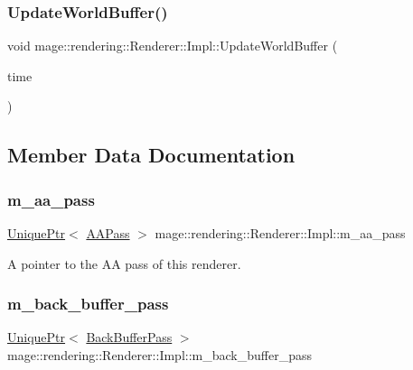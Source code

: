 \subsubsection{\texorpdfstring{Update\+World\+Buffer()}{UpdateWorldBuffer()}}
{\footnotesize\ttfamily void mage\+::rendering\+::\+Renderer\+::\+Impl\+::\+Update\+World\+Buffer (\begin{DoxyParamCaption}\item[{const \mbox{\hyperlink{classmage_1_1_game_time}{Game\+Time}} \&}]{time }\end{DoxyParamCaption})\hspace{0.3cm}{\ttfamily [private]}}



\subsection{Member Data Documentation}
\mbox{\label{classmage_1_1rendering_1_1_renderer_1_1_impl_aeb6351e4bacece7f3682685d74593d18}} 
\subsubsection{\texorpdfstring{m\+\_\+aa\+\_\+pass}{m\_aa\_pass}}
{\footnotesize\ttfamily \mbox{\hyperlink{namespacemage_a3316d7143a973e37adf1110f2e80ca31}{Unique\+Ptr}}$<$ \mbox{\hyperlink{classmage_1_1rendering_1_1_a_a_pass}{A\+A\+Pass}} $>$ mage\+::rendering\+::\+Renderer\+::\+Impl\+::m\+\_\+aa\+\_\+pass\hspace{0.3cm}{\ttfamily [private]}}

A pointer to the AA pass of this renderer. \mbox{\label{classmage_1_1rendering_1_1_renderer_1_1_impl_aa030ca4a6167a0dead99172e922ae724}} 
\subsubsection{\texorpdfstring{m\+\_\+back\+\_\+buffer\+\_\+pass}{m\_back\_buffer\_pass}}
{\footnotesize\ttfamily \mbox{\hyperlink{namespacemage_a3316d7143a973e37adf1110f2e80ca31}{Unique\+Ptr}}$<$ \mbox{\hyperlink{classmage_1_1rendering_1_1_back_buffer_pass}{Back\+Buffer\+Pass}} $>$ mage\+::rendering\+::\+Renderer\+::\+Impl\+::m\+\_\+back\+\_\+buffer\+\_\+pass\hspace{0.3cm}{\ttfamily [private]}}

